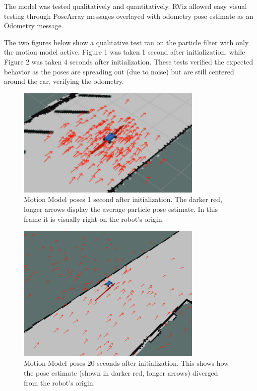 \documentclass{article}
\begin{document}
The model was tested qualitatively and quantitatively. RViz allowed easy visual testing through PoseArray messages overlayed with odometry pose estimate as an Odometry message. 

The two figures below show a qualitative test ran on the particle filter with only the motion model active. Figure 1 was taken 1 second after initialization, while Figure 2 was taken 4 seconds after initialization. These tests verified the expected behavior as the poses are spreading out (due to noise) but are still centered around the car, verifying the odometry.

\begin{figure}[H]
    \centering
    \includegraphics[width=0.8\textwidth]{1 sec.png} %
    \caption{Motion Model poses 1 second after initialization. The darker red, longer arrows display the average particle pose estimate. In this frame it is visually right on the robot's origin.}
    \label{fig:1sec}
\end{figure}

\begin{figure}[H]
    \centering
    \includegraphics[width=0.8\textwidth]{20secs.png} %
    \caption{Motion Model poses 20 seconds after initialization. This shows how the pose estimate (shown in darker red, longer arrows) diverged from the robot's origin.}
    \label{fig:20sec}
\end{figure}
\end{document}
